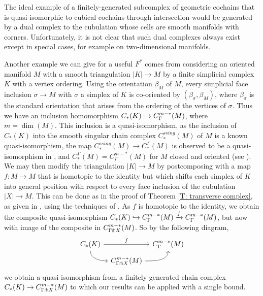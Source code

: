 The ideal example of a finitely-generated subcomplex of geometric cochains that is quasi-isomorphic to cubical cochains through intersection
would be generated by a dual complex to the cubulation whose cells are smooth manifolds with corners.
Unfortunately, it is not clear that such dual complexes always exist except in special cases, for example on two-dimensional manifolds.

Another example we can give for a useful $F^*$ comes from considering an oriented manifold $M$ with a smooth triangulation $|K|\to M$ by a finite simplicial complex $K$ with a vertex ordering.
Using the orientation $\beta_M$ of $M$, every simplicial face inclusion $\sigma\to M$ with $\sigma$ a simplex of $K$ is co-oriented by $(\beta_\sigma,\beta_M)$, where $\beta_\sigma$ is the standard orientation that arises from the ordering of the vertices of $\sigma$.
Thus we have an inclusion homomorphism $C_*(K)\hookrightarrow C^{m-*}_\Gamma(M)$, where $m = \dim(M)$.
This inclusion is a quasi-isomorphism, as the inclusion of $C_*(K)$ into the smooth singular chain complex $C_*^{ssing}(M)$ of $M$ is a known quasi-isomorphism, the map $C_*^{ssing}(M) \to C_*^\Gamma(M)$ is observed to be a quasi-isomorphism in \cite[Section 10]{Lipy14}, and $C_*^\Gamma(M)=C^{m-*}_\Gamma(M)$ for $M$ closed and oriented (see \cite[Section 12]{Lipy14}).
We may then modify the triangulation $|K|\to M$ by postcomposing with a map $f \colon M\to M$ that is homotopic to the identity but which shifts each simplex of $K$ into general position with respect to every face inclusion of the cubulation $|X|\to M$.
This can be done as in the proof of Theorem \ref{T: transverse complex}, as given in \cite{medina2022foundations}, using the techniques of \cite[Section 2.3]{GuPo74}.
As $f$ is homotopic to the identity, we obtain the composite quasi-isomorphism $C_*(K)\hookrightarrow C^{m-*}_\Gamma(M) \xrightarrow{f} C^{m-*}_\Gamma(M)$, but now with image of the composite in $C^{m-*}_{\Gamma \pitchfork X}(M)$.
So by the following diagram,
\begin{equation*}
	\begin{tikzcd}[column sep=tiny, row sep=tiny]
		C_*(K) \arrow[rr, "f"] \arrow[dr, out=-90, in=180]& & C^{m-*}_{\Gamma}(M) \\
		& C^{m-*}_{\Gamma \pf X}(M) \arrow[ur, out=0, in =-90] &
	\end{tikzcd}
\end{equation*}
we obtain a quasi-isomorphism from a finitely generated chain complex $C_*(K) \to C^{m-*}_{\Gamma \pitchfork X}(M)$ to which our results can be applied with a single bound.

